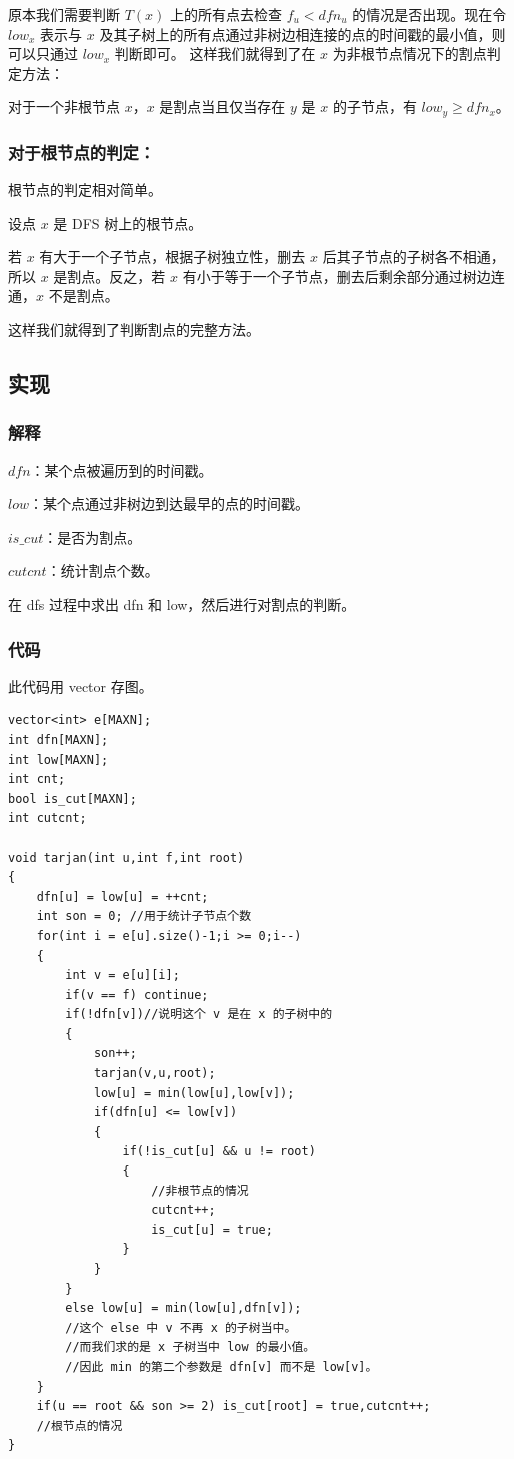 \documentclass[10pt,twoside,a4paper,UTF8]{ctexbook}
\begin{document}
	原本我们需要判断 $T(x)$ 上的所有点去检查 $f_u < dfn_u$ 的情况是否出现。现在令 $low_x$ 表示与 $x$ 及其子树上的所有点通过非树边相连接的点的时间戳的最小值，则可以只通过 $low_x$ 判断即可。
	这样我们就得到了在 $x$ 为非根节点情况下的割点判定方法：\par
	
	{
		\kaishu
		对于一个非根节点 $x$，$x$ 是割点当且仅当存在 $y$ 是 $x$ 的子节点，有 $low_y \geq dfn_x$。
	}
	\subsubsection{对于根节点的判定：}
	根节点的判定相对简单。\par
	设点 $x$ 是 DFS 树上的根节点。\par
	若 $x$ 有大于一个子节点，根据子树独立性，删去 $x$ 后其子节点的子树各不相通，所以 $x$ 是割点。反之，若 $x$ 有小于等于一个子节点，删去后剩余部分通过树边连通，$x$ 不是割点。\par
	\par
	这样我们就得到了判断割点的完整方法。
	
	\subsection{实现}
	\subsubsection{解释}
	$dfn$：某个点被遍历到的时间戳。\par
	$low$：某个点通过非树边到达最早的点的时间戳。\par
	$is\_cut$：是否为割点。\par
	$cutcnt$：统计割点个数。\par
	在 dfs 过程中求出 dfn 和 low，然后进行对割点的判断。
	\subsubsection{代码}
	\noindent
	此代码用 vector 存图。
	\begin{lstlisting}
vector<int> e[MAXN];
int dfn[MAXN];
int low[MAXN];
int cnt;
bool is_cut[MAXN];
int cutcnt;

void tarjan(int u,int f,int root)
{
	dfn[u] = low[u] = ++cnt;
	int son = 0; //用于统计子节点个数
	for(int i = e[u].size()-1;i >= 0;i--)
	{
		int v = e[u][i];
		if(v == f) continue;
		if(!dfn[v])//说明这个 v 是在 x 的子树中的
		{
			son++;
			tarjan(v,u,root);
			low[u] = min(low[u],low[v]);
			if(dfn[u] <= low[v])
			{
				if(!is_cut[u] && u != root)
				{
					//非根节点的情况
					cutcnt++;
					is_cut[u] = true;
				}
			}
		}
		else low[u] = min(low[u],dfn[v]);
		//这个 else 中 v 不再 x 的子树当中。
		//而我们求的是 x 子树当中 low 的最小值。
		//因此 min 的第二个参数是 dfn[v] 而不是 low[v]。
	}
	if(u == root && son >= 2) is_cut[root] = true,cutcnt++;
	//根节点的情况
}
	\end{lstlisting}
	
\end{document}
